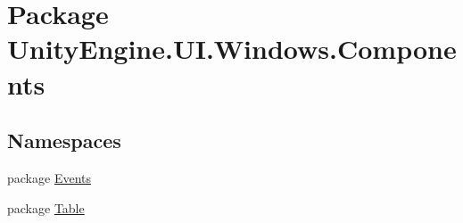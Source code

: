\hypertarget{namespace_unity_engine_1_1_u_i_1_1_windows_1_1_components}{}\section{Package Unity\+Engine.\+U\+I.\+Windows.\+Components}
\label{namespace_unity_engine_1_1_u_i_1_1_windows_1_1_components}
\subsection*{Namespaces}
\begin{DoxyCompactItemize}
\item 
package \hyperlink{namespace_unity_engine_1_1_u_i_1_1_windows_1_1_components_1_1_events}{Events}
\item 
package \hyperlink{namespace_unity_engine_1_1_u_i_1_1_windows_1_1_components_1_1_table}{Table}
\end{DoxyCompactItemize}
